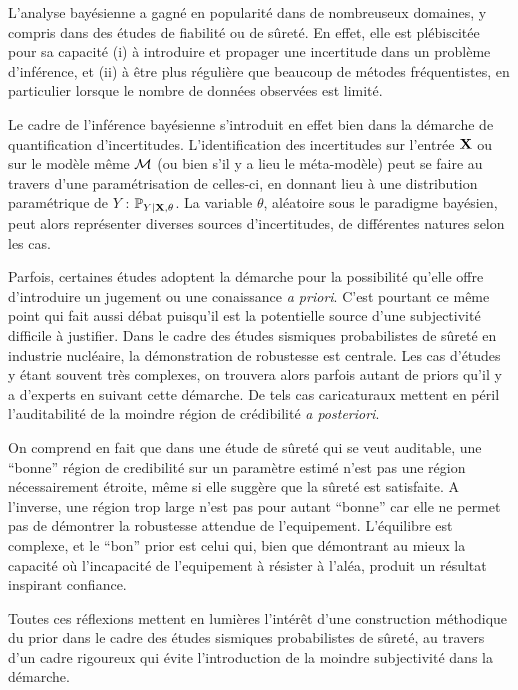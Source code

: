 L'analyse bayésienne a gagné en popularité dans de nombreuseux domaines, y compris dans des études de fiabilité ou de sûreté. 
En effet, elle est plébiscitée pour sa capacité (i) à introduire et propager une incertitude dans un problème d'inférence, et (ii) à être plus régulière que beaucoup de métodes fréquentistes, en particulier lorsque le nombre de données observées est limité.

Le cadre de l'inférence bayésienne s'introduit en effet bien dans la démarche de quantification d'incertitudes. 
L'identification des incertitudes sur l'entrée $\mathbf{X}$ ou sur le modèle même $\mathcal{M}$ (ou bien s'il y a lieu le méta-modèle) peut se faire au travers d'une paramétrisation de celles-ci, en donnant lieu à une distribution paramétrique de $Y$ : $\mathbb{P}_{Y|\mathbf{X},\theta}$. La variable $\theta$, aléatoire sous le paradigme bayésien, peut alors représenter diverses sources d'incertitudes, de différentes natures selon les cas.


Parfois, certaines études adoptent la démarche pour la possibilité qu'elle offre d'introduire un jugement  ou une conaissance \emph{a priori}.
C'est pourtant ce même point qui fait aussi débat puisqu'il est la potentielle source d'une subjectivité difficile à justifier.
Dans le cadre des études sismiques probabilistes de sûreté en industrie nucléaire, la démonstration de robustesse est centrale. Les cas d'études y étant souvent très complexes, on trouvera alors parfois autant de priors qu'il y a d'experts en suivant cette démarche.
De tels cas caricaturaux mettent en péril l'auditabilité de la moindre région de crédibilité \emph{a posteriori}.


On comprend en fait que dans une étude de sûreté qui se veut auditable, une ``bonne'' région de credibilité sur un paramètre estimé n'est pas une région nécessairement étroite, même si elle suggère que la sûreté est satisfaite. A l'inverse, une région trop large n'est pas pour autant ``bonne'' car elle ne permet pas de démontrer la robustesse attendue de l'equipement. L'équilibre est complexe, et le ``bon'' prior est celui qui, bien que démontrant au mieux la capacité où l'incapacité de l'equipement à résister à l'aléa, produit un résultat inspirant confiance. %

Toutes ces réflexions mettent en lumières l'intérêt d'une construction méthodique du prior dans le cadre des études sismiques probabilistes de sûreté, au travers d'un cadre rigoureux qui évite l'introduction de la moindre subjectivité dans la démarche.










